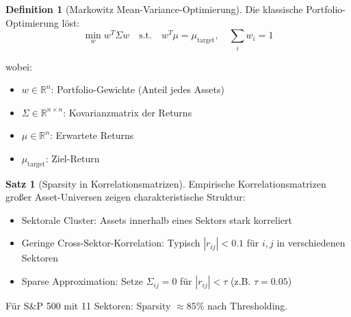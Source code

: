 ﻿\documentclass[a4paper,12pt]{report}
\theoremstyle{definition}
\newtheorem{definition}{Definition}
\newtheorem{satz}{Satz}
\begin{document}
	\begin{definition}[Markowitz Mean-Variance-Optimierung]
		Die klassische Portfolio-Opti\-mierung löst:
		\[
		\min_{w} w^T \Sigma w \quad \text{s.t.} \quad w^T \mu = \mu_{\text{target}}, \quad \sum_i w_i = 1
		\]
		
		wobei:
		\begin{itemize}
			\item $w \in \mathbb{R}^n$: Portfolio-Gewichte (Anteil jedes Assets)
			\item $\Sigma \in \mathbb{R}^{n \times n}$: Kovarianzmatrix der Returns
			\item $\mu \in \mathbb{R}^n$: Erwartete Returns
			\item $\mu_{\text{target}}$: Ziel-Return
		\end{itemize}
	\end{definition}
	
	\begin{satz}[Sparsity in Korrelationsmatrizen]
		Empirische Korrelationsmatrizen großer Asset-Universen zeigen charakteristische Struktur:
		\begin{itemize}
			\item Sektorale Cluster: Assets innerhalb eines Sektors stark korreliert
			\item Geringe Cross-Sektor-Korrelation: Typisch $|r_{ij}| < 0.1$ für $i, j$ in verschiedenen Sektoren
			\item Sparse Approximation: Setze $\Sigma_{ij} = 0$ für $|r_{ij}| < \tau$ (z.B. $\tau = 0.05$)
		\end{itemize}
		
		Für S\&P 500 mit 11 Sektoren: Sparsity $\approx 85\%$ nach Thresholding.
	\end{satz}
	
\end{document}
